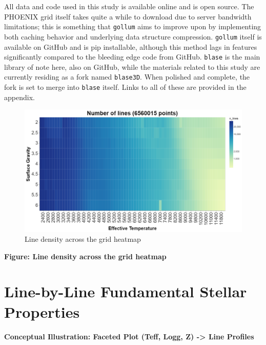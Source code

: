\documentclass[twocolumn]{aastex631}
\begin{document}
All data and code used in this study is available online and is open source. The PHOENIX grid itself takes quite a while to download
due to server bandwidth limitations; this is something that \texttt{gollum} aims to
improve upon by implementing both caching behavior and underlying data structure compression.
\texttt{gollum} itself is available on GitHub and is pip installable, although this
method lags in features significantly compared to the bleeding edge code from GitHub.
\texttt{blase} is the main library of note here, also on GitHub, while the
materials related to this study are currently residing as a fork named \texttt{blase3D}. When polished and complete,
the fork is set to merge into \texttt{blase} itself. Links to all of these are provided in the appendix.

\begin{figure}
    \includegraphics[width=\textwidth]{images/line_density.png}
    \caption{Line density across the grid heatmap}
\end{figure}


\begin{mdframed}
    \textbf{Figure: Line density across the grid heatmap}
\end{mdframed}


\section{Line-by-Line Fundamental Stellar Properties}
\begin{mdframed}
    \textbf{Conceptual Illustration: Faceted Plot (Teff, Logg, Z) -> Line Profiles}
\end{mdframed}
\end{document}
